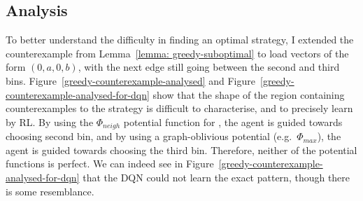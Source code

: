 \subsection{\DQL Analysis}

To better understand the difficulty in finding an optimal strategy, I extended the \CycleGraph counterexample from Lemma~\ref{lemma: greedy-suboptimal} to load vectors of the form $(0, a, 0, b)$, with the next edge still going between the second and third bins. Figure~\ref{greedy-counterexample-analysed} and Figure~\ref{greedy-counterexample-analysed-for-dqn} show that the shape of the region containing counterexamples to the \Greedy strategy is difficult to characterise, and to precisely learn by RL. By using the $\Phi_{neigh}$ potential function for \DQL, the agent is guided towards choosing second bin, and by using a graph-oblivious potential (e.g.\ $\Phi_{max}$), the agent is guided towards choosing the third bin. Therefore, neither of the potential functions is perfect. We can indeed see in Figure~\ref{greedy-counterexample-analysed-for-dqn} that the DQN could not learn the exact pattern, though there is some resemblance.


